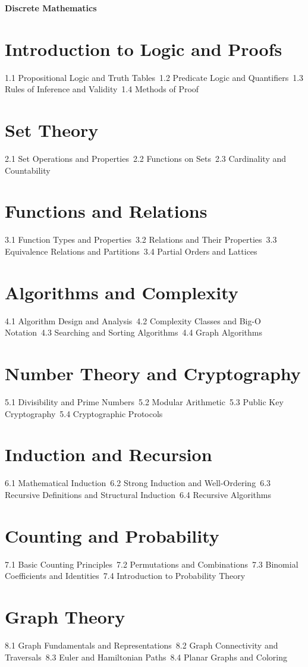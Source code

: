 {\LARGE \bf{Discrete Mathematics}}
\section{Introduction to Logic and Proofs}
1.1 Propositional Logic and Truth Tables\
1.2 Predicate Logic and Quantifiers\
1.3 Rules of Inference and Validity\
1.4 Methods of Proof\
\section{Set Theory}
2.1 Set Operations and Properties\
2.2 Functions on Sets\
2.3 Cardinality and Countability\
\section{Functions and Relations}
3.1 Function Types and Properties\
3.2 Relations and Their Properties\
3.3 Equivalence Relations and Partitions\
3.4 Partial Orders and Lattices\
\section{Algorithms and Complexity}
4.1 Algorithm Design and Analysis\
4.2 Complexity Classes and Big-O Notation\
4.3 Searching and Sorting Algorithms\
4.4 Graph Algorithms\
\section{Number Theory and Cryptography}
5.1 Divisibility and Prime Numbers\
5.2 Modular Arithmetic\
5.3 Public Key Cryptography\
5.4 Cryptographic Protocols\
\section{Induction and Recursion}
6.1 Mathematical Induction\
6.2 Strong Induction and Well-Ordering\
6.3 Recursive Definitions and Structural Induction\
6.4 Recursive Algorithms\
\section{Counting and Probability}
7.1 Basic Counting Principles\
7.2 Permutations and Combinations\
7.3 Binomial Coefficients and Identities\
7.4 Introduction to Probability Theory\
\section{Graph Theory}
8.1 Graph Fundamentals and Representations\
8.2 Graph Connectivity and Traversals\
8.3 Euler and Hamiltonian Paths\
8.4 Planar Graphs and Coloring\
